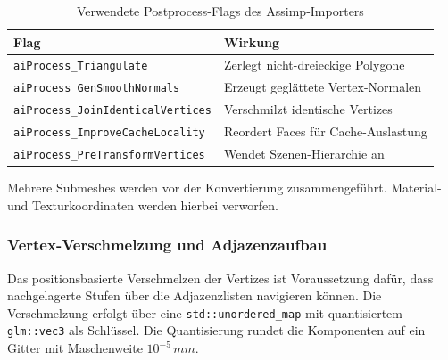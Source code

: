                 \begin{table}[ht]
                    \centering
                    \caption[Verwendete Assimp-Postprocess-Flags]{%
                        Verwendete Postprocess-Flags des Assimp-Importers%
                    }
                    \label{tab:impl-medusa-assimp-flags}
                    \renewcommand{\arraystretch}{1.2}
                    \begin{tabular}{@{} l p{7.5cm} @{}}
                        \toprule
                        \textbf{Flag} & \textbf{Wirkung} \\
                        \midrule
                        \texttt{aiProcess\_Triangulate}        & Zerlegt nicht-dreieckige Polygone \\
                        \texttt{aiProcess\_GenSmoothNormals}   & Erzeugt geglättete Vertex-Normalen \\
                        \texttt{aiProcess\_JoinIdenticalVertices} & Verschmilzt identische Vertizes \\
                        \texttt{aiProcess\_ImproveCacheLocality}  & Reordert Faces für Cache-Auslastung \\
                        \texttt{aiProcess\_PreTransformVertices} & Wendet Szenen-Hierarchie an \\
                        \bottomrule
                    \end{tabular}
                \end{table}

                Mehrere Submeshes werden vor der Konvertierung zusammengeführt.
                Material- und Texturkoordinaten werden hierbei verworfen.

            \subsubsection{Vertex-Verschmelzung und Adjazenzaufbau}\label{subsubsec:impl-medusa-vertex-welding}
                Das positionsbasierte Verschmelzen der Vertizes ist Voraussetzung dafür, dass nachgelagerte Stufen über die Adjazenzlisten navigieren können.
                Die Verschmelzung erfolgt über eine \texttt{std::unordered\_map} mit quantisiertem \texttt{glm::vec3} als Schlüssel.
                Die Quantisierung rundet die Komponenten auf ein Gitter mit Maschenweite $10^{-5}\,\si{mm}$.

